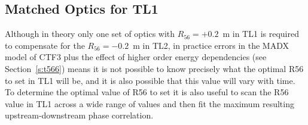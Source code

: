 
\subsection{Matched Optics for TL1}
\label{ss:tl1Optics}

Although in theory only one set of optics with \(R_{56} = +0.2\)~m in TL1 is required to compensate for the \(R_{56} = -0.2\)~m in TL2, in practice errors in the MADX model of CTF3 plus the effect of higher order energy dependencies (see Section~\ref{s:t566}) means it is not possible to know precisely what the optimal R56 to set in TL1 will be, and it is also possible that this value will vary with time. To determine the optimal value of R56 to set it is also useful to scan the R56 value in TL1 across a wide range of values and then fit the maximum resulting upstream-downstream phase correlation.

